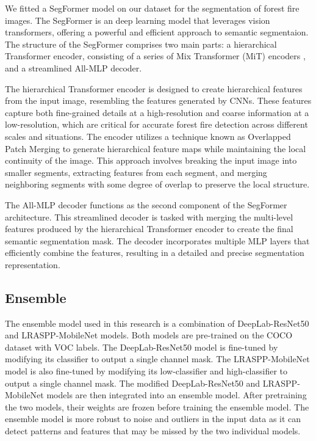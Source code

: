 We fitted a SegFormer model \cite{xie_segformer_2021} on our dataset for the segmentation of forest fire images. The SegFormer is an deep learning model that leverages vision transformers, offering a powerful and efficient approach to semantic segmentaion. The structure of the SegFormer comprises two main parts: a hierarchical Transformer encoder, consisting of a series of Mix Transformer (MiT) encoders \cite{xie_segformer_2021}, and a streamlined All-MLP decoder.

The hierarchical Transformer encoder is designed to create hierarchical features from the input image, resembling the features generated by CNNs. These features capture both fine-grained details at a high-resolution and coarse information at a low-resolution, which are critical for accurate forest fire detection across different scales and situations. The encoder utilizes a technique known as Overlapped Patch Merging to generate hierarchical feature maps while maintaining the local continuity of the image. This approach involves breaking the input image into smaller segments, extracting features from each segment, and merging neighboring segments with some degree of overlap to preserve the local structure.

The All-MLP decoder functions as the second component of the SegFormer architecture. This streamlined decoder is tasked with merging the multi-level features produced by the hierarchical Transformer encoder to create the final semantic segmentation mask. The decoder incorporates multiple MLP layers that efficiently combine the features, resulting in a detailed and precise segmentation representation.

\subsection{Ensemble}

The ensemble model used in this research is a combination of DeepLab-ResNet50 \cite{chen_rethinking_2017} and LRASPP-MobileNet \cite{howard2019searching} models. Both models are pre-trained on the COCO dataset with VOC labels. The DeepLab-ResNet50 model is fine-tuned by modifying its classifier to output a single channel mask. The LRASPP-MobileNet model is also fine-tuned by modifying its low-classifier and high-classifier to output a single channel mask. The modified DeepLab-ResNet50 and LRASPP-MobileNet models are then integrated into an ensemble model. After pretraining the two models, their weights are frozen before training the ensemble model. The ensemble model is more robust to noise and outliers in the input data as it can detect patterns and features that may be missed by the two individual models.


